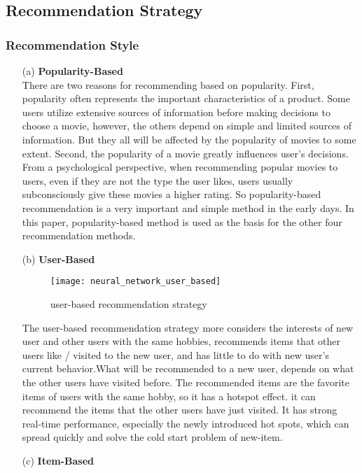 \subsection{Recommendation Strategy}
\subsubsection{Recommendation Style}
\begin{itemize}

\item[(a)]\textbf{Popularity-Based}\\
There are two reasons for recommending based on popularity. First, popularity often represents the important characteristics of a product. Some users utilize extensive sources of information before making decisions to choose a movie, however, the others depend on simple and limited sources of information. But they all will be affected by the popularity of movies to some extent. Second, the popularity of a movie greatly influences user's decisions. From a psychological perspective, when recommending popular movies to users, even if they are not the type the user likes, users usually subconsciously give these movies a higher rating\cite{ahn2006utilizing}. So popularity-based recommendation is a very important and simple method in the early days. In this paper, popularity-based method is used as the basis for the other four recommendation methods.
\item[(b)]\textbf{User-Based}\\
\begin{figure}[h]
\caption{user-based recommendation strategy}
\centering
\texttt{[image: neural\_network\_user\_based]}
\end{figure}
The user-based recommendation strategy more considers the interests of new user and other users with the same hobbies, recommends items that other users like / visited to the new user, and has little to do with new user's current behavior.What will be recommended to a new user, depends on what the other users have visited before. The recommended items are the favorite items of users with the same hobby, so it has a hotspot effect. it can recommend the items that the other users have just visited. It has strong real-time performance, especially the newly introduced hot spots, which can spread quickly and solve the cold start problem of new-item.
\item[(c)]\textbf{Item-Based}\\
\begin{figure}[h]

\end{figure}
\end{itemize}
